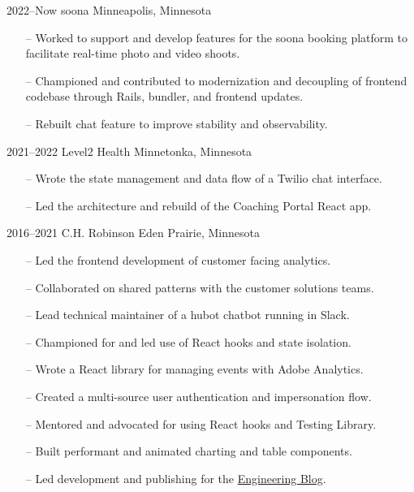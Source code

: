 \documentclass[]{cv-style} %
\begin{document}
\begin{entrylist}


\entry
{2022--Now}
{soona}
{Minneapolis, Minnesota}
{
\begin{itemize}
    \item[--] Worked to support and develop features for the soona booking platform to facilitate real-time photo and video shoots.
    \item[--] Championed and contributed to modernization and decoupling of frontend codebase through Rails, bundler, and frontend updates.
    \item[--] Rebuilt chat feature to improve stability and observability.
\end{itemize}}

\entry
{2021--2022}
{Level2 Health}
{Minnetonka, Minnesota}
{
\begin{itemize}
    \item[--] Wrote the state management and data flow of a Twilio chat interface.
    \item[--] Led the architecture and rebuild of the Coaching Portal React app.
\end{itemize}}

\entry
{2016--2021}
{C.H. Robinson}
{Eden Prairie, Minnesota}
{

\begin{itemize}
    \item[--] Led the frontend development of customer facing analytics.
    \item[--] Collaborated on shared patterns with the customer solutions teams.
    \item[--] Lead technical maintainer of a hubot chatbot running in Slack.
    \item[--] Championed for and led use of React hooks and state isolation.
\end{itemize}

\begin{itemize}
    \item[--] Wrote a React library for managing events with Adobe Analytics.
    \item[--] Created a multi-source user authentication and impersonation flow.
    \item[--] Mentored and advocated for using React hooks and Testing Library.
    \item[--] Built performant and animated charting and table components.
    \item[--] Led development and publishing for the \href{https://engineering.chrobinson.com}{Engineering Blog}.
\end{itemize}

}
\end{entrylist}
\end{document}
